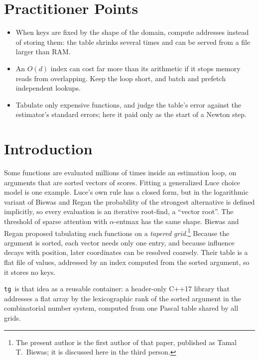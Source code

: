 \documentclass[preprint,12pt]{elsarticle}
\newcommand{\tgl}{\texttt{tg}}
\begin{document}
\section*{Practitioner Points}
\begin{itemize}
\item When keys are fixed by the shape of the domain, compute addresses instead of storing them: the table shrinks several times and can be served from a file larger than RAM.
\item An $O(d)$ index can cost far more than its arithmetic if it stops memory reads from overlapping. Keep the loop short, and batch and prefetch independent lookups.
\item Tabulate only expensive functions, and judge the table's error against the estimator's standard errors; here it paid only as the start of a Newton step.
\end{itemize}

\section{Introduction}\label{sec:intro}

Some functions are evaluated millions of times inside an estimation loop, on
arguments that are sorted vectors of scores. Fitting a generalized Luce choice model\cite{luce1959} is one example. Luce's own rule has a closed form, but in the logarithmic variant of Biswas and Regan\cite{biswas2015} the probability of the strongest alternative is defined implicitly, so every evaluation is an iterative root-find, a ``vector root''. The threshold of sparse attention with
$\alpha$-entmax\cite{peters2019} has the same shape. Biswas and Regan proposed tabulating such functions on a \emph{tapered grid}.{\renewcommand{\thefootnote}{\fnsymbol{footnote}}\footnote{The present author is the first author of that paper, published as Tamal T.\ Biswas; it is discussed here in the third person.}} Because the argument is sorted,
each vector needs only one entry, and because influence decays with position, later
coordinates can be resolved coarsely. Their table is a flat file of values,
addressed by an index computed from the sorted argument, so it stores no keys.

\tgl\ is that idea as a reusable container: a header-only C++17 library that addresses a flat array by the lexicographic rank of the sorted argument in the combinatorial number system,\cite{lehmer1964,buckles1977,knuth2011} computed from one Pascal table shared by all grids.
\end{document}
